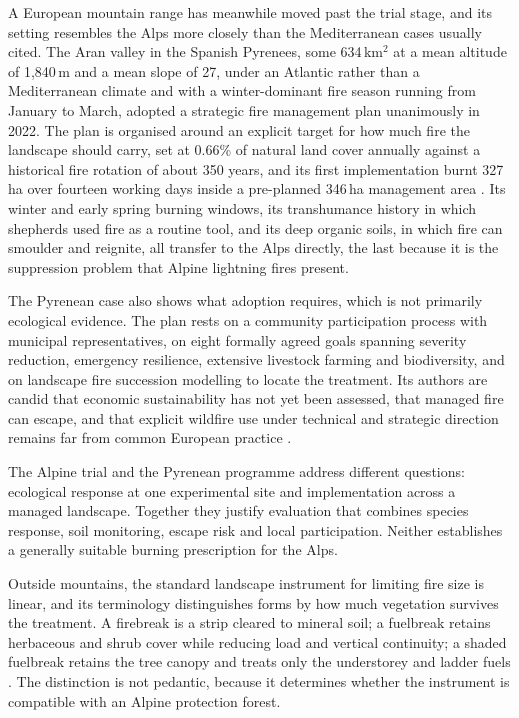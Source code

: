 \documentclass[11pt,a4paper]{article}
\begin{document}
A European mountain range has meanwhile moved past the trial stage, and its setting resembles the Alps more closely than the Mediterranean cases usually cited. The Aran valley in the Spanish Pyrenees, some 634\,km$^2$ at a mean altitude of 1{,}840\,m and a mean slope of 27\degree{}, under an Atlantic rather than a Mediterranean climate and with a winter-dominant fire season running from January to March, adopted a strategic fire management plan unanimously in 2022. The plan is organised around an explicit target for how much fire the landscape should carry, set at 0.66\% of natural land cover annually against a historical fire rotation of about 350 years, and its first implementation burnt 327\,ha over fourteen working days inside a pre-planned 346\,ha management area \citep{oliveres_path_2025}. Its winter and early spring burning windows, its transhumance history in which shepherds used fire as a routine tool, and its deep organic soils, in which fire can smoulder and reignite, all transfer to the Alps directly, the last because it is the suppression problem that Alpine lightning fires present.

The Pyrenean case also shows what adoption requires, which is not primarily ecological evidence. The plan rests on a community participation process with municipal representatives, on eight formally agreed goals spanning severity reduction, emergency resilience, extensive livestock farming and biodiversity, and on landscape fire succession modelling to locate the treatment. Its authors are candid that economic sustainability has not yet been assessed, that managed fire can escape, and that explicit wildfire use under technical and strategic direction remains far from common European practice \citep{oliveres_path_2025}.

The Alpine trial and the Pyrenean programme address different questions: ecological response at one experimental site and implementation across a managed landscape. Together they justify evaluation that combines species response, soil monitoring, escape risk and local participation. Neither establishes a generally suitable burning prescription for the Alps.

Outside mountains, the standard landscape instrument for limiting fire size is linear, and its terminology distinguishes forms by how much vegetation survives the treatment. A firebreak is a strip cleared to mineral soil; a fuelbreak retains herbaceous and shrub cover while reducing load and vertical continuity; a shaded fuelbreak retains the tree canopy and treats only the understorey and ladder fuels \citep{ascoli_firebreak_2018}. The distinction is not pedantic, because it determines whether the instrument is compatible with an Alpine protection forest.
\end{document}
